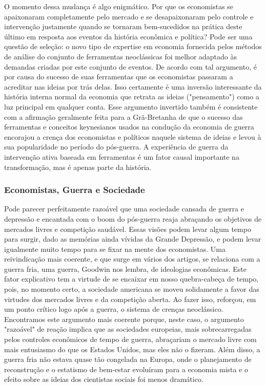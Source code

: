 \documentclass[12pt]{article}
\begin{document}
O momento dessa mudança é algo enigmático. Por que os economistas se apaixonaram completamente pelo mercado e se desapaixonaram pelo controle e intervenção justamente quando se tornaram bem-sucedidos na prática deste último em resposta aos eventos da história econômica e política? Pode ser uma questão de seleção: o novo tipo de expertise em economia fornecida pelos métodos de análise do conjunto de ferramentas neoclássicas foi melhor adaptado às demandas criadas por este conjunto de eventos. De acordo com tal argumento, é por causa do sucesso de suas ferramentas que os economistas passaram a acreditar nas ideias por trás delas. Isso certamente é uma inversão interessante da história interna normal da economia que retrata as ideias ("pensamento") como a luz principal em qualquer conta. Esse argumento invertido também é consistente com a afirmação geralmente feita para a Grã-Bretanha de que o sucesso das ferramentas e conceitos keynesianos usados na condução da economia de guerra encorajou a crença dos economistas e políticos naquele sistema de ideias e levou à sua popularidade no período do pós-guerra. A experiência de guerra da intervenção ativa baseada em ferramentas é um fator causal importante na transformação, mas é apenas parte da história.

\subsubsection{\textbf{Economistas, Guerra e Sociedade}}

Pode parecer perfeitamente razoável que uma sociedade cansada de guerra e depressão e encantada com o boom do pós-guerra reaja abraçando os objetivos de mercados livres e competição saudável. Essas visões podem levar algum tempo para surgir, dado as memórias ainda vívidas da Grande Depressão, e podem levar igualmente muito tempo para se fixar na mente dos economistas. Uma reivindicação mais coerente, e que surge em vários dos artigos, se relaciona com a guerra fria, uma guerra, Goodwin nos lembra, de ideologias econômicas. Este fator explicativo tem a virtude de se encaixar em nosso quebra-cabeça de tempo, pois, no momento certo, a sociedade americana se moveu solidamente a favor das virtudes dos mercados livres e da competição aberta. Ao fazer isso, reforçou, em um ponto crítico logo após a guerra, o sistema de crenças neoclássico. Encontramos este argumento mais coerente porque, neste caso, o argumento "razoável" de reação implica que as sociedades europeias, mais sobrecarregadas pelos controles econômicos de tempo de guerra, abraçariam o mercado livre com mais entusiasmo do que os Estados Unidos, mas eles não o fizeram. Além disso, a guerra fria não estava quase tão congelada na Europa, onde o planejamento de reconstrução e o estatismo de bem-estar evoluíram para a economia mista e o efeito sobre as ideias dos cientistas sociais foi menos dramático.
\end{document}
